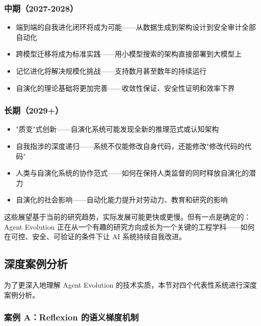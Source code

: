 \subsubsection{中期（2027-2028）}

\begin{itemize}
\item 端到端的自我进化闭环将成为可能——从数据生成到架构设计到安全审计全部自动化
\item 跨模型迁移将成为标准实践——用小模型搜索的架构直接部署到大模型上
\item 记忆进化将解决规模化挑战——支持数月甚至数年的持续运行
\item 自演化的理论基础将更加完善——收敛性保证、安全性证明和效率下界
\end{itemize}

\subsubsection{长期（2029+）}

\begin{itemize}
\item "质变"式创新——自演化系统可能发现全新的推理范式或认知架构
\item 自我指涉的深度递归——系统不仅能修改自身代码，还能修改"修改代码的代码"
\item 人类与自演化系统的协作范式——如何在保持人类监督的同时释放自演化的潜力
\item 自演化的社会影响——自动化能力提升对劳动力、教育和研究的影响
\end{itemize}

这些展望基于当前的研究趋势，实际发展可能更快或更慢。但有一点是确定的：Agent Evolution 正在从一个有趣的研究方向成长为一个关键的工程学科——如何在可控、安全、可验证的条件下让 AI 系统持续自我改进。

\subsection{深度案例分析}\label{sec:intro-deep-cases}

为了更深入地理解 Agent Evolution 的技术实质，本节对四个代表性系统进行深度案例分析。

\subsubsection{案例 A：Reflexion 的语义梯度机制}

